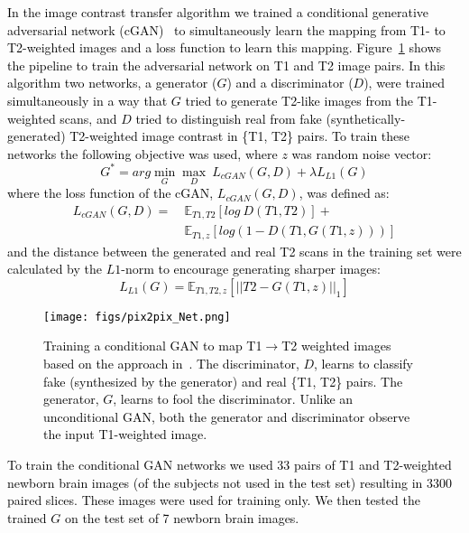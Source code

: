 \documentclass[journal,transmag]{IEEEtran}
\DeclareMathOperator*{\amin}{min}
\DeclareMathOperator*{\amax}{max}
\begin{document}
\textcolor{black}{In the image contrast transfer algorithm we trained a conditional generative adversarial network (cGAN)~\cite{isola2017image} to simultaneously learn the mapping from T1- to T2-weighted images and a loss function to learn this mapping. Figure~\ref{fig:T1toT2Net} shows the pipeline to train the adversarial network on T1 and T2 image pairs. In this algorithm two networks, a generator ($G$) and a discriminator ($D$), were trained simultaneously in a way that $G$ tried to generate T2-like images from the T1-weighted scans, and $D$ tried to distinguish real from fake (synthetically-generated) T2-weighted image contrast in \{T1, T2\} pairs. To train these networks the following objective was used, where $z$ was random noise vector:
\begin{equation}
    G^* = arg\amin_G\amax_D \ L_{cGAN}(G,D) + \lambda L_{L1}(G)
\end{equation}
where the loss function of the cGAN, $L_{cGAN}(G,D)$, was defined as:
\begin{equation}
\begin{split}
    L_{cGAN}(G,D) = \  & \mathbb{E}_{T1, T2}[log\ D(T1,T2)]+ \\ 
    & \mathbb{E}_{T1, z}[log(1-D(T1,G(T1,z)))]
\end{split}
\end{equation}
and the distance between the generated and real T2 scans in the training set were calculated by the $L1$-norm to encourage generating sharper images:
\begin{equation}
    L_{L1}(G) =  \mathbb{E}_{T1, T2, z}[||T2-G(T1,z)||_1]
\end{equation}
\begin{figure}
    \centering
    \texttt{[image: figs/pix2pix\_Net.png]}
    \caption{Training a conditional GAN to map T1$\rightarrow$T2 weighted images based on the approach in~\cite{isola2017image}. The discriminator, $D$, learns to classify fake (synthesized by the generator) and real \{T1, T2\} pairs. The generator, $G$, learns to fool the discriminator. Unlike an unconditional GAN, both the generator and discriminator observe the input T1-weighted image.}
    \label{fig:T1toT2Net}
\end{figure}
To train the conditional GAN networks we used 33 pairs of T1 and T2-weighted newborn brain images (of the subjects not used in the test set) resulting in 3300 paired slices. These images were used for training only. We then tested the trained $G$ on the test set of 7 newborn brain images.
}


\ifCLASSOPTIONcaptionsoff
  \newpage
\fi





\end{document}
